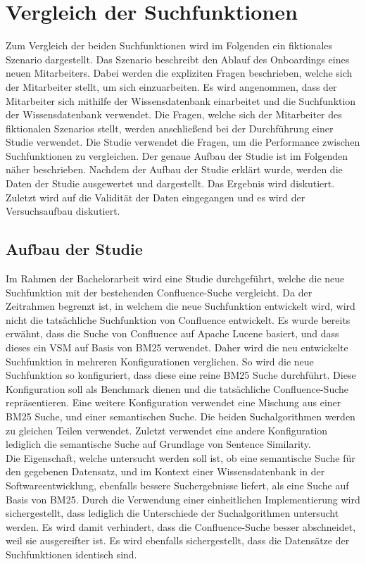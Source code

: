 \chapter{Vergleich der Suchfunktionen}
\label{chap:vergleich-der-suchfunktionen}

Zum Vergleich der beiden Suchfunktionen wird im Folgenden ein fiktionales Szenario dargestellt.
Das Szenario beschreibt den Ablauf des Onboardings eines neuen Mitarbeiters.
Dabei werden die expliziten Fragen beschrieben, welche sich der Mitarbeiter stellt, um sich einzuarbeiten.
Es wird angenommen, dass der Mitarbeiter sich mithilfe der Wissensdatenbank einarbeitet und die Suchfunktion der Wissensdatenbank verwendet.
Die Fragen, welche sich der Mitarbeiter des fiktionalen Szenarios stellt, werden anschließend bei der Durchführung einer Studie verwendet.
Die Studie verwendet die Fragen, um die Performance zwischen Suchfunktionen zu vergleichen.
Der genaue Aufbau der Studie ist im Folgenden näher beschrieben.
Nachdem der Aufbau der Studie erklärt wurde, werden die Daten der Studie ausgewertet und dargestellt.
Das Ergebnis wird diskutiert.
Zuletzt wird auf die Validität der Daten eingegangen und es wird der Versuchsaufbau diskutiert.

\section{Aufbau der Studie}
Im Rahmen der Bachelorarbeit wird eine Studie durchgeführt, welche die neue Suchfunktion mit der bestehenden Confluence-Suche vergleicht.
Da der Zeitrahmen begrenzt ist, in welchem die neue Suchfunktion entwickelt wird, wird nicht die tatsächliche Suchfunktion von Confluence entwickelt.
Es wurde bereits erwähnt, dass die Suche von Confluence auf Apache Lucene basiert, und dass dieses ein VSM auf Basis von BM25 verwendet.
Daher wird die neu entwickelte Suchfunktion in mehreren Konfigurationen verglichen.
So wird die neue Suchfunktion so konfiguriert, dass diese eine reine BM25 Suche durchführt.
Diese Konfiguration soll als Benchmark dienen und die tatsächliche Confluence-Suche repräsentieren.
Eine weitere Konfiguration verwendet eine Mischung aus einer BM25 Suche, und einer semantischen Suche.
Die beiden Suchalgorithmen werden zu gleichen Teilen verwendet.
Zuletzt verwendet eine andere Konfiguration lediglich die semantische Suche auf Grundlage von Sentence Similarity.\\

Die Eigenschaft, welche untersucht werden soll ist, ob eine semantische Suche für den gegebenen Datensatz, und im Kontext einer Wissensdatenbank in der Softwareentwicklung, ebenfalls bessere Suchergebnisse liefert, als eine Suche auf Basis von BM25.
Durch die Verwendung einer einheitlichen Implementierung wird sichergestellt, dass lediglich die Unterschiede der Suchalgorithmen untersucht werden.
Es wird damit verhindert, dass die Confluence-Suche besser abschneidet, weil sie ausgereifter ist.
Es wird ebenfalls sichergestellt, dass die Datensätze der Suchfunktionen identisch sind.\\

